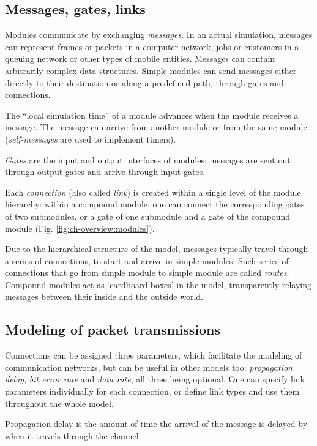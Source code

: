 \subsection{Messages, gates, links}

Modules communicate by exchanging
\textit{messages}. In an actual simulation,
messages can represent frames or packets in a computer network, jobs
or customers in a queuing network or other types of mobile entities.
Messages can contain arbitrarily complex data structures. Simple
modules can send messages either directly to their destination or
along a predefined path, through gates and connections.


The ``local simulation time'' of a module advances when the module
receives a message. The message can arrive from another module
or from the same module (\textit{self-messages} are used to implement
timers).


\textit{Gates} are the input and output interfaces of
modules; messages are sent out through output gates and arrive through
input gates.

Each \textit{connection} (also called
\textit{link}) is created within a single level of the
module hierarchy: within a compound module, one can connect the
corresponding gates of two submodules, or a gate of one submodule and
a gate of the compound module (Fig.
\ref{fig:ch-overview:modules}).

Due to the hierarchical structure of the model, messages typically
travel through a series of connections, to start and arrive in simple
modules. Such series of connections that go from simple module to
simple module are called \textit{routes}.  Compound modules act as
`cardboard boxes' in the model, transparently relaying messages
between their inside and the outside world.


\subsection{Modeling of packet transmissions}

Connections can be assigned three parameters, which facilitate
the modeling of communication networks, but can be useful in
other models too: \textit{propagation delay}, \textit{bit error rate}
and \textit{data rate}, all three being optional. One can specify
link parameters individually for each connection, or define link types
and use them throughout the whole model.

Propagation delay is the amount of time the arrival of
the message is delayed by when it travels through the channel.

